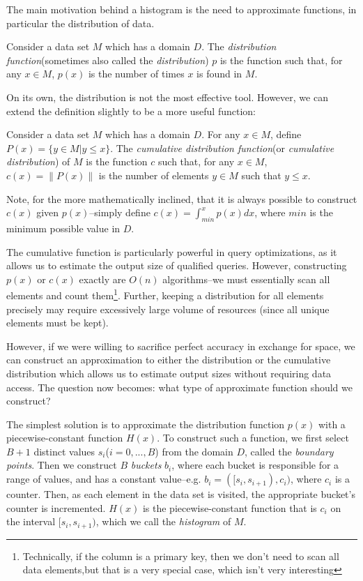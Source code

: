 The main motivation behind a histogram is the need to approximate functions, in particular the distribution of data.

\begin{defn}
				Consider a data set $M$ which has a domain $D$. The \emph{distribution function}(sometimes also called the \emph{distribution}) $p$ is the function such that, for any $x \in M$, $p(x)$ is the number of times $x$ is found in $M$.
\end{defn}

On its own, the distribution is not the most effective tool. However, we can extend the definition slightly to be a more useful function:

\begin{defn}
				Consider a data set $M$ which has a domain $D$. For any $x \in M$, define $P(x) = \lbrace y \in M | y \leq x \rbrace$. The \emph{cumulative distribution function}(or \emph{cumulative distribution}) of $M$ is the function $c$ such that, for any $x \in M$, $c(x) = \left\| P(x) \right\|$ is the number of elements $y \in M$ such that $y \leq x$. 
\end{defn}

Note, for the more mathematically inclined, that it is always possible to construct $c(x)$ given $p(x)$--simply define $c(x) = \int_{min}^x p(x) dx$, where $min$ is the minimum possible value in $D$.

The cumulative function is particularly powerful in query optimizations, as it allows us to estimate the output size of qualified queries. However, constructing $p(x)$ or $c(x)$ exactly are $O(n)$ algorithms--we must essentially scan all elements and count them\footnote{Technically, if the column is a primary key, then we don't need to scan all data elements,but that is a very special case, which isn't very interesting}. Further, keeping a distribution for all elements precisely may require excessively large volume of resources (since all unique elements must be kept). 

However, if we were willing to sacrifice perfect accuracy in exchange for space, we can construct an approximation to either the distribution or the cumulative distribution which allows us to estimate output sizes without requiring data access.  The question now becomes: what type of approximate function should we construct?

The simplest solution is to approximate the distribution function $p(x)$ with a piecewise-constant function $H(x)$. To construct such a function, we first select $B+1$ distinct values $s_i$($i = 0,...,B$) from the domain $D$, called the \emph{boundary points}. Then we construct $B$ \emph{buckets} $b_i$, where each bucket is responsible for a range of values, and has a constant value--e.g. $b_i = ([s_i,s_{i+1}),c_i)$, where $c_i$ is a counter. Then, as each element in the data set is visited, the appropriate bucket's counter is incremented. $H(x)$ is the piecewise-constant function that is $c_i$ on the interval $[s_i,s_{i+1})$, which we call the \emph{histogram} of $M$.

